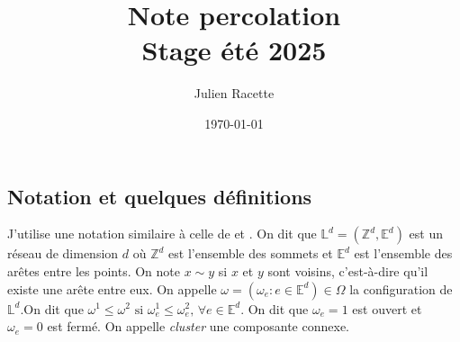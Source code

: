 


\pagestyle{fancy}
\fancyhead[r]{\today}
\fancyfoot[c]{\thepage}
\renewcommand{\headrulewidth}{0.2pt}
\setlength{\headheight}{15pt} 

\title{Note percolation\\ Stage été 2025}
\author{Julien Racette}
\date{\today}
\makeatletter
\renewcommand{\maketitle}{
    \begin{titlepage}
        \vspace*{\fill} %
        \begin{center}
        {\LARGE\bfseries \@title \par} %
            \vspace{1.5em}
            {\large \@author \par} %
            \vspace{1em}
            {\large \@date \par} %
        \end{center}
        \vspace*{\fill} %
    \end{titlepage}
}
\makeatother
\maketitle
\tableofcontents
\pagebreak

\subsection{Notation et quelques définitions}
J'utilise une notation similaire à celle de  \cite{duminilcopin2022introduction} et \cite{grimmett1999percolation}. On dit que $\mathbb{L}^d = (\mathbb{Z}^d,\mathbb{E}^d)$ est un réseau de dimension $d$ où $\mathbb{Z}^d$ est l'ensemble des sommets et $\mathbb{E}^d$ est l'ensemble des arêtes entre les points. On note $x \sim y$ si $x$ et $y$ sont voisins, c'est-à-dire qu'il existe une arête entre eux. On appelle $\omega=(\omega_e:e\in \mathbb{E}^d) \in \Omega$ la configuration de $\mathbb{L}^d$.On dit que $\omega^1 \leq \omega^2 \text{ si } \omega^1_e \leq \omega^2_e \text{, }\forall e \in \mathbb{E}^d$.
On dit que $\omega_e = 1$ est ouvert et $\omega_e = 0$ est fermé. On appelle \textit{cluster} une composante connexe.

\printbibliography


